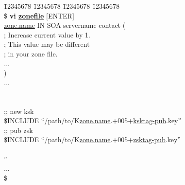 \begin{tabbing}
\hspace{0.5in} \= 12345678 \= 12345678 \= 12345678 \= 12345678 \kill \\
\hspace{0.5in}\$ {\bf vi \underline{zonefile}} $[$ENTER$]$ \\
\hspace{0.5in}\underline{zone.name}        IN     SOA        servername contact ( \\
\hspace{3.5in}{\bf 2005092104} ; Increase current value by 1. \\
\hspace{4.4in};  This value may be different \\
\hspace{4.4in}; in your zone file. \\
\hspace{0.5in}\>           \>         ... \\
\hspace{0.5in}\>              ) \\
\hspace{0.5in}... \\
 \\
 \\
\hspace{0.5in};; new ksk \\
\hspace{0.5in}\$INCLUDE ``/path/to/K\underline{zone.name}.+005+\underline{ksktag-pub}.key'' \\
\hspace{0.5in};; pub zsk \\
\hspace{0.5in}\$INCLUDE ``/path/to/K\underline{zone.name}.+005+\underline{zsktag-pub}.key'' \\
\hspace{0.5in}{\bf ;; new zsk} \\
'' \\
\hspace{0.5in}... \\
\hspace{0.5in}\$ \\
\end{tabbing}

